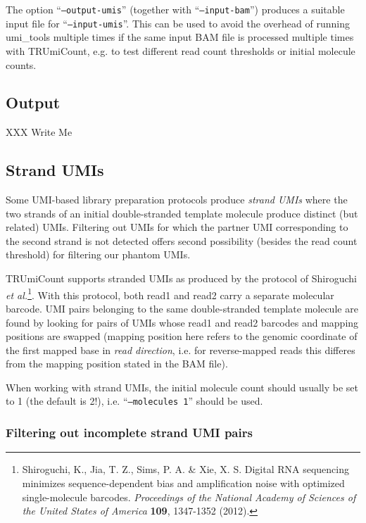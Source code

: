 \documentclass[10pt]{article}
\begin{document}
The option ``\texttt{--output-umis}'' (together with ``\texttt{--input-bam}'') produces a suitable input file for ``\texttt{--input-umis}''. This can be used to avoid the overhead of running umi\_tools multiple times if the same input BAM file is processed multiple times with TRUmiCount, e.g. to test different read count thresholds or initial molecule counts.

\subsection{Output}

XXX Write Me

\subsection{Strand UMIs}

Some UMI-based library preparation protocols produce \emph{strand UMIs} where the two strands of an initial double-stranded template molecule produce distinct (but related) UMIs. Filtering out UMIs for which the partner UMI corresponding to the second strand is not detected offers second possibility (besides the read count threshold) for filtering our phantom UMIs.

TRUmiCount supports stranded UMIs as produced by the protocol of Shiroguchi \textit{et al.}\footnote{Shiroguchi, K., Jia, T. Z., Sims, P. A. \& Xie, X. S. Digital RNA sequencing minimizes sequence-dependent bias and amplification noise with optimized single-molecule barcodes. \textit{Proceedings of the National Academy of Sciences of the United States of America} \textbf{109}, 1347-1352 (2012).}. With this protocol, both read1 and read2 carry a separate molecular barcode. UMI pairs belonging to the same double-stranded template molecule are found by looking for pairs of UMIs whose read1 and read2 barcodes and mapping positions are swapped (mapping position here refers to the genomic coordinate of the first mapped base in \emph{read direction}, i.e. for reverse-mapped reads this differes from the mapping position stated in the BAM file).

When working with strand UMIs, the initial molecule count should usually be set to 1 (the default is 2!), i.e. ``\texttt{--molecules 1}'' should be used.

\subsubsection*{Filtering out incomplete strand UMI pairs}
\end{document}
